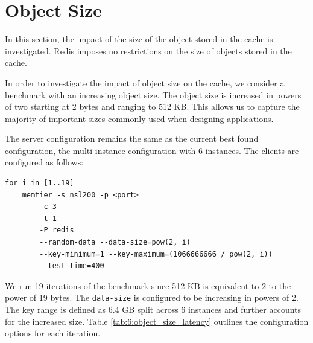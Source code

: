 \section{Object Size}
In this section, the impact of the size of the object stored in the cache is investigated. Redis imposes no restrictions on the size of objects stored in the cache.

In order to investigate the impact of object size on the cache, we consider a benchmark with an increasing object size. The object size is increased in powers of two starting at 2 bytes and ranging to 512 KB. This allows us to capture the majority of important sizes commonly used when designing applications.

The server configuration remains the same as the current best found configuration, the multi-instance configuration with 6 instances. The clients are configured as follows:

\begin{lstlisting}
for i in [1..19]
    memtier -s nsl200 -p <port>
        -c 3
        -t 1
        -P redis
        --random-data --data-size=pow(2, i)
        --key-minimum=1 --key-maximum=(1066666666 / pow(2, i))
        --test-time=400
\end{lstlisting}

We run 19 iterations of the benchmark since 512 KB is equivalent to 2 to the power of 19 bytes. The \texttt{data-size} is configured to be increasing in powers of 2. The key range is defined as 6.4 GB split across 6 instances and further accounts for the increased size. Table \ref{tab:6:object_size_latency} outlines the configuration options for each iteration.

